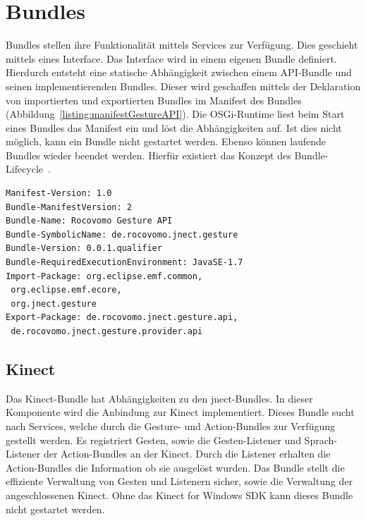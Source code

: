 \section{Bundles}
\label{sec:osgiBundles}

Bundles stellen ihre Funktionalit\"at mittels Services zur Verf\"ugung. Dies geschieht mittels eines Interface. Das Interface wird in einem eigenen Bundle definiert. Hierdurch entsteht eine statische Abh\"angigkeit zwischen einem API-Bundle und seinen implementierenden Bundles. Dieser wird geschaffen mittels der Deklaration von importierten und exportierten Bundles im Manifest des Bundles (Abbildung~\ref{listing:manifestGestureAPI}). Die OSGi-Runtime liest beim Start eines Bundles das Manifest ein und l\"ost die Abh\"angigkeiten auf. Ist dies nicht m\"oglich, kann ein Bundle nicht gestartet werden. Ebenso k\"onnen laufende Bundles wieder beendet werden. Hierf\"ur existiert das Konzept des Bundle-Lifecycle~\footnotemark[3].

\lstset{language=Java,
 basicstyle=\footnotesize, 
 numbers=left,
 captionpos=b,
 showspaces=false,             
 showstringspaces=false,}
\begin{lstlisting}[caption={Manifest der Gesture API}, label={listing:manifestGestureAPI}]
Manifest-Version: 1.0
Bundle-ManifestVersion: 2
Bundle-Name: Rocovomo Gesture API
Bundle-SymbolicName: de.rocovomo.jnect.gesture
Bundle-Version: 0.0.1.qualifier
Bundle-RequiredExecutionEnvironment: JavaSE-1.7
Import-Package: org.eclipse.emf.common,
 org.eclipse.emf.ecore,
 org.jnect.gesture
Export-Package: de.rocovomo.jnect.gesture.api,
 de.rocovomo.jnect.gesture.provider.api
\end{lstlisting}

\subsection{Kinect}

Das Kinect-Bundle hat Abh\"angigkeiten zu den jnect-Bundles. In dieser Komponente wird die Anbindung zur Kinect implementiert. Dieses Bundle sucht nach Services, welche durch die Gesture- und Action-Bundles zur Verf\"ugung gestellt werden. Es registriert Gesten, sowie die Gesten-Listener und Sprach-Listener der Action-Bundles an der Kinect. Durch die Listener erhalten die Action-Bundles die Information ob sie ausgel\"ost wurden.
Das Bundle stellt die effiziente Verwaltung von Gesten und Listenern sicher, sowie die Verwaltung der angeschlossenen Kinect. Ohne das Kinect for Windows SDK kann dieses Bundle nicht gestartet werden.


